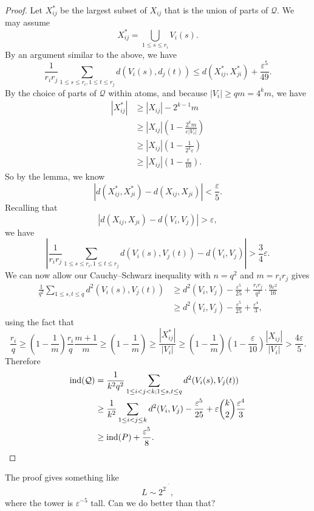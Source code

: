 \documentclass[a4paper]{article}
\newcommand\ind{\mathrm{ind}}
\begin{document}
\begin{proof}
  Let $X_{ij}^*$ be the largest subset of $X_{ij}$ that is the union of parts of $\mathcal{Q}$. We may assume
  \[
    X_{ij}^* = \bigcup_{1 \leq s \leq r_i} V_i(s).
  \]
  By an argument similar to the above, we have
  \[
    \frac{1}{r_i r_j} \sum_{1 \leq s \leq r_i, 1 \leq t \leq r_j} d(V_i(s), d_j(t)) \leq d(X_{ij}^*, X_{ji}^*) + \frac{\varepsilon^5}{49}.
  \]
  By the choice of parts of $\mathcal{Q}$ within atoms, and because $|V_i| \geq qm = 4^k m$, we have
  \begin{align*}
    |X_{ij}^*| &\geq |X_{ij}| - 2^{k - 1}m \\
    &\geq |X_{ij}| (1 - \frac{2^k m}{\varepsilon |V_i|}) \\
    &\geq |X_{ij}| \left(1 - \frac{1}{2^k \varepsilon}\right)\\
    &\geq |X_{ij}| \left(1 - \frac{\varepsilon}{10}\right).
  \end{align*}
  So by the lemma, we know
  \[
    |d(X_{ij}^*, X_{ji}^*) - d(X_{ij}, X_{ji})| < \frac{\varepsilon}{5}.
  \]
  Recalling that
  \[
    |d(X_{ij}, X_{ji}) - d(V_i, V_j)| > \varepsilon,
  \]
  we have
  \[
    \left| \frac{1}{r_i r_j} \sum_{1 \leq s \leq r_i, 1 \leq t \leq r_j} d(V_i(s), V_j(t)) - d(V_i, V_j)\right| > \frac{3}{4} \varepsilon.
  \]
  We can now allow our Cauchy--Schwarz inequality with $n = q^2$ and $m = r_i r_j$ gives
  \begin{align*}
    \frac{1}{q^2} \sum_{1 \leq s, t \leq q} d^2 (V_i(s), V_j(t)) &\geq d^2(V_i, V_j) - \frac{\varepsilon^5}{25} + \frac{r_i r_j}{q^2}\cdot \frac{9\varepsilon^2}{16} \\
    &\geq d^2(V_i, V_j) - \frac{\varepsilon^5}{25} + \frac{\varepsilon^4}{3},
  \end{align*}
  using the fact that
  \[
    \frac{r_i}{q} \geq \left(1 - \frac{1}{m}\right) \frac{r_i}{q} \frac{m + 1}{m} \geq \left(1 - \frac{1}{m}\right) \geq \frac{|X_{ij}^*|}{|V_i|} \geq \left(1 - \frac{1}{m}\right) \left(1 - \frac{\varepsilon}{10}\right) \frac{|X_{ij}|}{|V_i|} > \frac{4\varepsilon}{5}.
  \]
  Therefore
  \begin{align*}
    \ind(\mathcal{Q}) &= \frac{1}{k^2q^2}\sum_{1 \leq i < j < k; 1 \leq s, t\leq q} d^2(V_i(s), V_j(t))\\
    &\geq \frac{1}{k^2} \sum_{1 \leq i < j \leq k} d^2(V_i, V_j) - \frac{\varepsilon^5}{25} + \varepsilon \binom{k}{2} \frac{\varepsilon^4}{3}\\
    &\geq \ind(P) + \frac{\varepsilon^5}{8}.\qedhere
  \end{align*}
\end{proof}
The proof gives something like
\[
  L \sim 2^{2^{.^{.^{.^{2}}}}},
\]
where the tower is $\varepsilon^{-5}$ tall. Can we do better than that?
\end{document}
